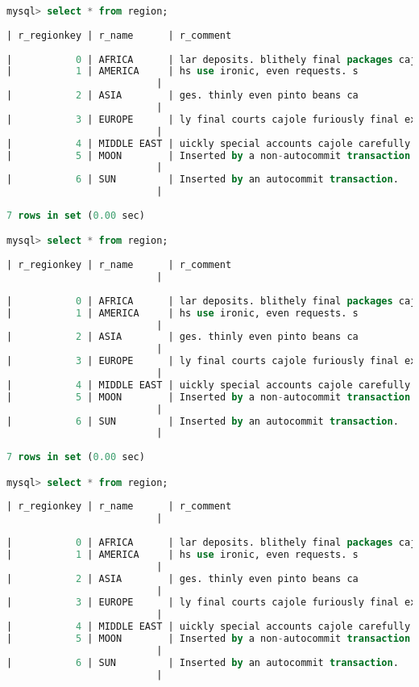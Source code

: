\documentclass{article}
\begin{document}
\begin{lstlisting}[language=sql]
mysql> select * from region;
  
| r_regionkey | r_name      | r_comment 
  
|           0 | AFRICA      | lar deposits. blithely final packages cajole. regular waters are final requests. regular accounts are according to  |
|           1 | AMERICA     | hs use ironic, even requests. s
                          |
|           2 | ASIA        | ges. thinly even pinto beans ca
                          |
|           3 | EUROPE      | ly final courts cajole furiously final excuse
                          |
|           4 | MIDDLE EAST | uickly special accounts cajole carefully blithely close requests. carefully final asymptotes haggle furiousl        |
|           5 | MOON        | Inserted by a non-autocommit transaction.
                          |
|           6 | SUN         | Inserted by an autocommit transaction.
                          |
  
7 rows in set (0.00 sec)

mysql> select * from region;
  
| r_regionkey | r_name      | r_comment
                          |
  
|           0 | AFRICA      | lar deposits. blithely final packages cajole. regular waters are final requests. regular accounts are according to  |
|           1 | AMERICA     | hs use ironic, even requests. s
                          |
|           2 | ASIA        | ges. thinly even pinto beans ca
                          |
|           3 | EUROPE      | ly final courts cajole furiously final excuse
                          |
|           4 | MIDDLE EAST | uickly special accounts cajole carefully blithely close requests. carefully final asymptotes haggle furiousl        |
|           5 | MOON        | Inserted by a non-autocommit transaction.
                          |
|           6 | SUN         | Inserted by an autocommit transaction.
                          |
  
7 rows in set (0.00 sec)

mysql> select * from region;
  
| r_regionkey | r_name      | r_comment
                          |
  
|           0 | AFRICA      | lar deposits. blithely final packages cajole. regular waters are final requests. regular accounts are according to  |
|           1 | AMERICA     | hs use ironic, even requests. s
                          |
|           2 | ASIA        | ges. thinly even pinto beans ca
                          |
|           3 | EUROPE      | ly final courts cajole furiously final excuse
                          |
|           4 | MIDDLE EAST | uickly special accounts cajole carefully blithely close requests. carefully final asymptotes haggle furiousl        |
|           5 | MOON        | Inserted by a non-autocommit transaction.
                          |
|           6 | SUN         | Inserted by an autocommit transaction.
                          |
  

\end{lstlisting}
\end{document}
